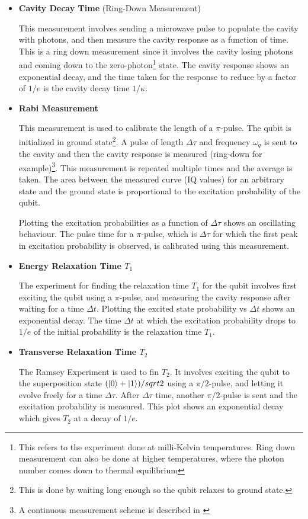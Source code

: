 \begin{itemize}
\item \textbf{Cavity Decay Time} (Ring-Down Measurement)

This measurement involves sending a microwave pulse to populate the cavity with photons, and then measure the cavity response as a function of time. This is a ring down measurement since it involves the cavity losing photons and coming down to the zero-photon\footnote{This refers to the experiment done at milli-Kelvin temperatures. Ring down measurement can also be done at higher temperatures, where the photon number comes down to thermal equilibrium} state. The cavity response shows an exponential decay, and the time taken for the response to reduce by a factor of $1/e$ is the cavity decay time $1/\kappa$.

\item \textbf{Rabi Measurement}

This measurement is used to calibrate the length of a $\pi$-pulse. The qubit is initialized in ground state\footnote{This is done by waiting long enough so the qubit relaxes to ground state.}. A pulse of length $\Delta\tau$ and frequency $\omega_q$ is sent to the cavity and then the cavity response is measured (ring-down for example)\footnote{A continuous measurement scheme is described in \cite{Bianchetti2009}}. This measurement is repeated multiple times and the average is taken. The area between the measured curve (IQ values) for an arbitrary state and the ground state is proportional to the excitation probability of the qubit.

Plotting the excitation probabilities as a function of $\Delta\tau$ shows an oscillating behaviour. The pulse time for a $\pi$-pulse, which is $\Delta\tau$ for which the first peak in excitation probability is observed, is calibrated using this measurement.

\item \textbf{Energy Relaxation Time $T_1$}

The experiment for finding the relaxation time $T_1$ for the qubit involves first exciting the qubit using a $\pi$-pulse, and measuring the cavity response after waiting for a time $\Delta t$. Plotting the excited state probability vs $\Delta t$ shows an exponential decay. The time $\Delta t$ at which the excitation probability drops to $1/e$ of the initial probability is the relaxation time $T_1$.

\item \textbf{Transverse Relaxation Time $T_2$}

The Ramsey Experiment is used to fin $T_2$. It involves exciting the qubit to the superposition state $(\ket{0}+\ket{1})/sqrt{2}$ using a $\pi/2$-pulse, and letting it evolve freely for a time $\Delta\tau$. After $\Delta\tau$ time, another $\pi/2$-pulse is sent and the excitation probability is measured. This plot shows an exponential decay which gives $T_2$ at a decay of $1/e$.
\end{itemize}